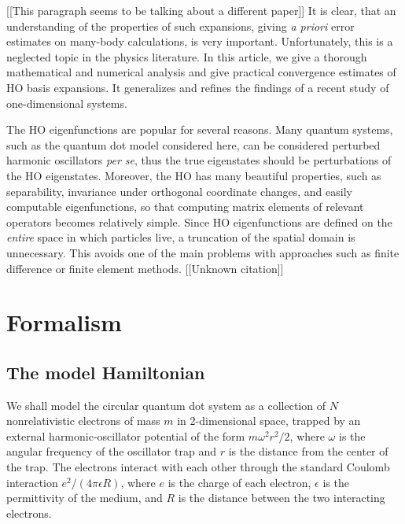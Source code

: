 [[This paragraph seems to be talking about a different paper]]
It is clear, that an understanding of the properties of such expansions,
giving \emph{a priori} error estimates on many-body calculations, is very
important. Unfortunately, this is a neglected topic in the physics
literature. In this article, we give a thorough mathematical and numerical
analysis and give practical convergence estimates of HO basis expansions. It
generalizes and refines the findings of a recent study of one-dimensional
systems.\cite{Kvaal2007}

The HO eigenfunctions are popular for several reasons. Many quantum systems, such as the quantum dot model considered here, can be considered perturbed harmonic oscillators \textit{per se}, thus the true eigenstates should be perturbations of the HO eigenstates.  Moreover, the HO has many beautiful properties, such as separability, invariance under orthogonal coordinate changes, and easily computable eigenfunctions, so that computing matrix elements of relevant operators becomes relatively simple.  Since HO eigenfunctions are defined on the \emph{entire} space in which particles live, a truncation of the spatial domain is unnecessary.  This avoids one of the main problems with approaches such as finite difference or finite element methods.\cite{ram2002finite} [[Unknown citation]]

\section{Formalism}
\label{sec:formalism}

\subsection{The model Hamiltonian}
\label{subsec:modelHamiltonian}

We shall model the circular quantum dot system as a collection of $N$ nonrelativistic electrons of mass $m$ in 2-dimensional space, trapped by an external harmonic-oscillator potential of the form $m \omega^2 r^2 / 2$, where $\omega$ is the angular frequency of the oscillator trap and $r$ is the distance from the center of the trap.  The electrons interact with each other through the standard Coulomb interaction $e^2 / (4 \pi \epsilon R)$, where $e$ is the charge of each electron, $\epsilon$ is the permittivity of the medium, and $R$ is the distance between the two interacting electrons.

